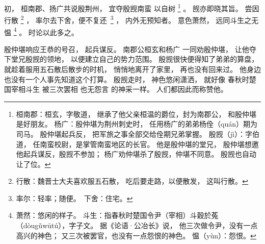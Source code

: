 
\switchcolumn*[\section{}]

初，
桓南郡、扬广共说殷荆州，
宜夺殷觊南蛮
以自树%
\footnote{%
    桓南郡：桓玄，字敬道，
            继承了他父亲桓温的爵位，封为南郡公，
            和殷仲堪是好朋友。
    杨广：殷仲堪为荆州刺史时，
          任用杨广的弟弟杨佺（quán）期为司马。
          殷仲堪起兵反，
          把军旅之事全部交给佺期兄弟掌握。
    殷觊（jì）：字伯道，
                任南蛮校尉，是掌管南蛮地区的长官。
                他是殷仲堪的堂兄，
                殷仲堪想邀他起兵谋反，殷觊不参加；
                杨广劝仲堪杀了殷觊，仲堪不同意。
                殷觊也自动让了位。
}%
。
觊亦即晓其旨。
尝因行散%
\footnote{%
    行散：魏晋士大夫喜欢服五石散，
          吃后要走路，以便散发，
          这叫行散。
}%
，
率尔去下舍，便不复\mbox{还%
\footnote{%
    率尔：轻率；随便。
    下舍：住宅。
}}%
，
内外无预知者。
意色萧然，
远同斗生之无愠%
\footnote{%
    萧然：悠闲的样子。
    斗生：指春秋时楚国令尹（宰相）斗穀於菟（dòugǔwūtú），字子文。
          据《论语·公冶长》说，
          他三次做令尹，没有一点高兴的神色；
          又三次被罢官，也没有一点怨恨的神色。
    愠（yùn）：怨恨。
}%
。
时论以此多之。

\switchcolumn

殷仲堪响应王恭的号召，
起兵谋反。
南郡公桓玄和杨广
一同劝殷仲堪，
让他夺下堂兄殷觊的领地，
以便建立自己的势力范围。
殷觊很快便得知了弟弟的算盘，
就趁着服用五石散后散步的时机，
悄悄地离开了家里，
再也没有回来过。
他身边也没有一个人事先知道这个打算。
殷觊走时，
神色悠闲潇洒，
就好像
春秋时楚国宰相斗生
被三次罢相
也无怨言
的神采一样。
人们都因此而称赞他。


